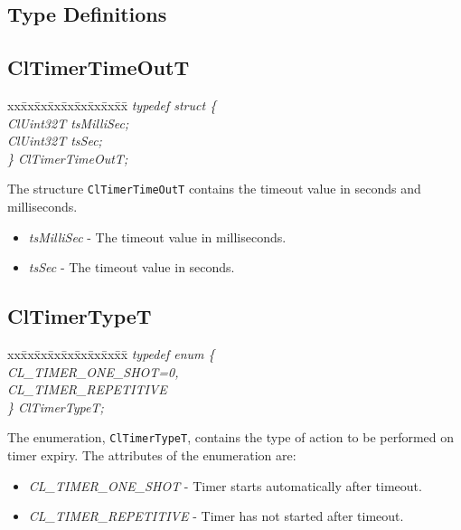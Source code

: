 \begin{flushleft}
\section{Type Definitions}


\subsection{ClTimerTimeOutT }
\begin{tabbing}
xx\=xx\=xx\=xx\=xx\=xx\=xx\=xx\=xx\=\kill
\textit{typedef struct \{}\\
\>\>\>\>\textit{ClUint32T tsMilliSec;}\\
\>\>\>\>\textit{ClUint32T tsSec;}\\
\textit{\} ClTimerTimeOutT;}\end{tabbing}
The structure {\tt{ClTimerTimeOutT}} contains the timeout value in seconds and milliseconds.
\begin{itemize}
\item
\textit{tsMilliSec} - The timeout value in milliseconds.
\item
\textit{tsSec} - The timeout value in seconds.
\end{itemize}




\subsection{ClTimerTypeT }
\begin{tabbing}
xx\=xx\=xx\=xx\=xx\=xx\=xx\=xx\=xx\=\kill
\textit{typedef enum \{}\\
\>\>\>\>\textit{CL\_TIMER\_ONE\_SHOT=0,}\\
\>\>\>\>\textit{CL\_TIMER\_REPETITIVE}\\
\textit{\} ClTimerTypeT;}\end{tabbing}
The enumeration, {\tt{ClTimerTypeT}}, contains the type of action to be performed on timer expiry. The attributes of the enumeration are:
\begin{itemize}
\item
\textit{CL\_\-TIMER\_\-ONE\_\-SHOT} - Timer starts automatically after timeout.
\item
\textit{CL\_\-TIMER\_\-REPETITIVE} - Timer has not started after timeout.
\end{itemize}




\end{flushleft}
